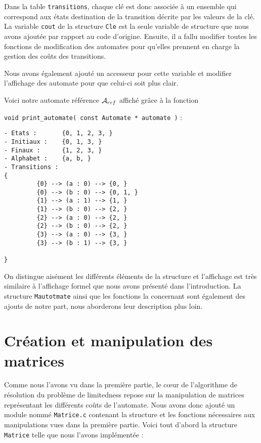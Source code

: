 \documentclass[12pt]{memoir}
\begin{document}
\medskip
Dans la table \verb?transitions?, chaque clé est donc associée à un ensemble qui correspond aux états destination de la transition décrite par les valeurs de la clé. La variable \verb?cout? de la structure \verb?Cle? est la seule variable de structure que nous avons ajoutée par rapport au code d'origine. Ensuite, il a fallu modifier toutes les fonctions de modification des automates pour qu'elles prennent en charge la gestion des coûts des transitions.

Nous avons également ajouté un accesseur pour cette variable et modifier l'affichage des automate pour que celui-ci soit plus clair.

Voici notre automate référence $\mathcal{A}_{ref}$ affiché grâce à la fonction
\begin{center}
\verb?void print_automate( const Automate * automate )? :\\ 
\end{center}

\begin{verbatim}
- Etats :       {0, 1, 2, 3, }
- Initiaux :    {0, 1, 3, }
- Finaux :      {1, 2, 3, }
- Alphabet :    {a, b, }
- Transitions : 
{
         {0} --> (a : 0) --> {0, }
         {0} --> (b : 0) --> {0, 1, }
         {1} --> (a : 1) --> {1, }
         {1} --> (b : 0) --> {2, }
         {2} --> (a : 0) --> {2, }
         {2} --> (b : 0) --> {2, }
         {3} --> (a : 0) --> {3, }
         {3} --> (b : 1) --> {3, }
  
}
\end{verbatim}
$ $\\

On distingue aisément les différents éléments de la structure et l'affichage
est très similaire à l'affichage formel que nous avons présenté dans
l'introduction. La structure \verb?Mautotmate? ainsi que les fonctions la
concernant sont également des ajouts de notre part, nous aborderons leur
description plus loin.

\section{Création et manipulation des matrices}

Comme nous l'avons vu dans la première partie, le cœur de l'algorithme de
résolution du problème de limitedness repose sur la manipulation de matrices
représentant les différents coûts de l'automate. Nous avons donc ajouté un
module nommé \texttt{Matrice.c} contenant la structure et les fonctions nécessaires aux manipulations vues dans la première partie. Voici tout d'abord la structure \verb?Matrice? telle que nous l'avons implémentée : \\
\end{document}
